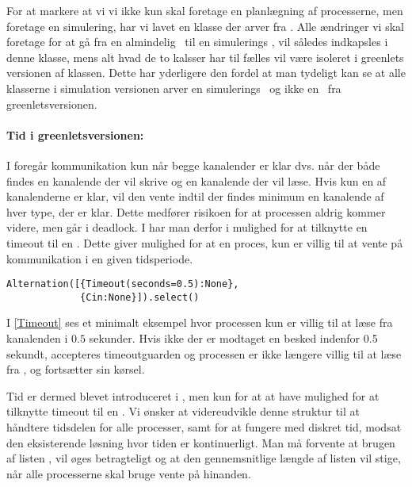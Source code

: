 
For at markere at vi vi ikke kun skal foretage en planlægning
af processerne, men foretage en simulering, har vi lavet en
 klasse der arver fra . Alle ændringer
vi skal foretage for at gå fra en almindelig \sched ~til en simulerings
\sched, vil således indkapsles i denne klasse, mens alt hvad de to
kalsser har til fælles vil være isoleret i greenlets versionen af
\sched klassen. Dette har yderligere den fordel at man tydeligt kan se
at alle klasserne i simulation versionen arver en simulerings \sched ~og
ikke en \sched ~fra greenletsversionen.


\paragraph*{Tid i greenletsversionen:} I \pycsp foregår kommunikation
kun når begge kanalender er klar dvs. når der både findes en
kanalende der vil skrive og en kanalende der vil læse. Hvis
kun en af kanalenderne er klar, vil den vente indtil der findes
minimum en kanalende af hver type, der er klar. Dette medfører
risikoen for at processen aldrig kommer videre, men går i deadlock.
I \pycsp har man derfor i  mulighed for at
tilknytte en timeout til en . Dette giver mulighed for
at en proces, kun er villig til at vente på kommunikation i en
given tidsperiode. 
\begin{lstlisting}[float=hbtp, label=Timeout,caption=Timeout i Alternation (fra dokumentationen til PyCSP)]
Alternation([{Timeout(seconds=0.5):None}, 
             {Cin:None}]).select()
\end{lstlisting}

I \cref{Timeout} ses et minimalt eksempel hvor processen kun er villig
til at læse fra kanalenden  i $0.5$ sekunder. Hvis ikke der
er modtaget en besked indenfor 0.5 sekundt, accepteres timeoutguarden
og processen er ikke længere villig til at læse fra , og
fortsætter sin kørsel.

Tid er dermed blevet introduceret i \pycsp, men kun for at at have
mulighed for at tilknytte timeout til en . Vi ønsker
at videreudvikle denne struktur til at håndtere tidsdelen for alle
processer, samt for at fungere med diskret tid, modsat den eksisterende
løsning hvor tiden er kontinuerligt. Man må forvente at brugen af
listen , vil øges betragteligt og at den gennemsnitlige
længde af listen vil stige, når alle processerne skal bruge vente på
hinanden.

